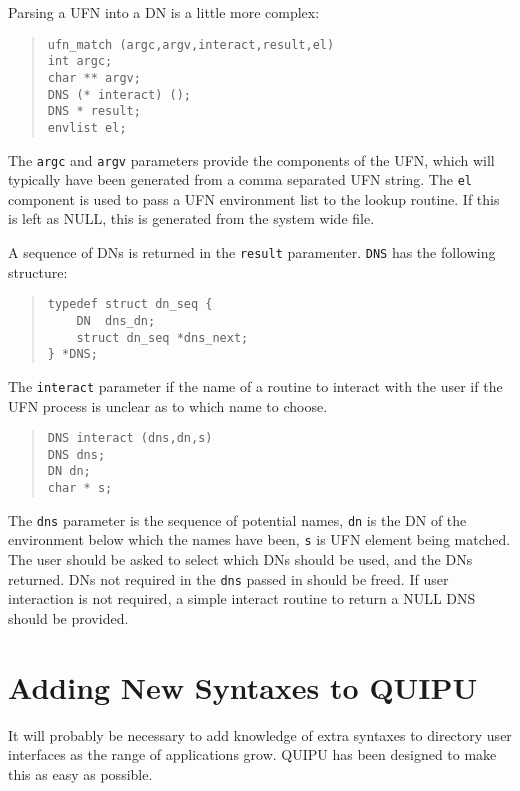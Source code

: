 Parsing a UFN into a DN is a little more complex:
\begin{quote}\small{}\begin{verbatim}
ufn_match (argc,argv,interact,result,el)
int argc;
char ** argv;
DNS (* interact) ();
DNS * result;
envlist el;
\end{verbatim}\end{quote}
The \verb+argc+ and \verb+argv+ parameters provide the components of
the UFN, which will typically have been generated from a comma
separated UFN string.
The \verb+el+ component is used to pass a UFN environment list to the
lookup routine.  If this is left as NULL, this is generated from the
system wide  file.

A sequence of DNs is returned in the \verb+result+ paramenter.
\verb+DNS+ has the following structure:
\begin{quote}\small\begin{verbatim}
typedef struct dn_seq {
    DN  dns_dn;
    struct dn_seq *dns_next;
} *DNS;
\end{verbatim}\end{quote}

The \verb+interact+ parameter if the name of a routine to interact
with the user if the UFN process is unclear as to which name to choose.
\begin{quote}\small\begin{verbatim}
DNS interact (dns,dn,s)
DNS dns;
DN dn;
char * s;
\end{verbatim}\end{quote}
The \verb+dns+ parameter is the sequence of potential names, \verb+dn+
is the DN of the environment below which the names have been, \verb+s+
is UFN element being matched. 
The user should be asked to select which DNs should be used, and the
DNs returned.  DNs not required in the \verb+dns+ passed in should be
freed.
If user interaction is not required, a simple interact routine to
return a NULL DNS should be provided.



\section {Adding New Syntaxes to QUIPU}
\label{add_syntax}


It will probably be necessary to add knowledge of extra syntaxes to
directory user interfaces as the range of applications grow.
QUIPU has been designed to make this as easy as possible.

